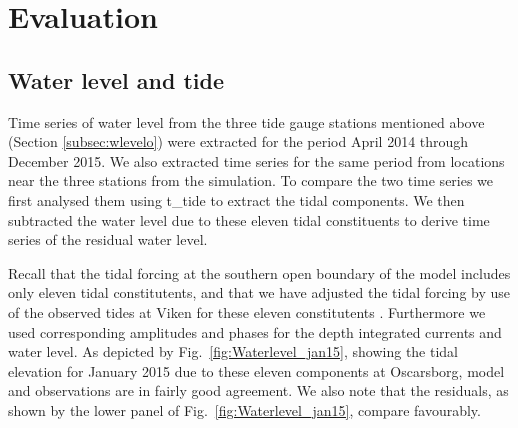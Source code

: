 \section{Evaluation}
\label{sec:evalu}
\subsection{Water level and tide}
\label{subsec:wlevele}
Time series of water level from the three tide gauge stations mentioned above (Section \ref{subsec:wlevelo}) were extracted for the period April 2014 through December 2015. We also extracted time series for the same period from locations near the three stations from the simulation. To compare the two time series we first analysed them using t\_tide \citep{pavlo:etal:2002} to extract the tidal components. We then subtracted the water level due to these eleven tidal constituents to derive time series of the residual water level.   


Recall that the tidal forcing at the southern open boundary of the model includes only eleven tidal constitutents, and that we have adjusted the tidal forcing by use of the observed tides at Viken for these eleven constitutents \citep{roed:etal:2016}. Furthermore we used corresponding amplitudes and phases for the depth integrated currents and water level. As depicted by Fig.~\ref{fig:Waterlevel_jan15}, showing the tidal elevation for January 2015 due to these eleven components at Oscarsborg, model and observations are in fairly good agreement. We also note that the residuals, as shown by the lower panel of Fig.~\ref{fig:Waterlevel_jan15}, compare favourably. 

